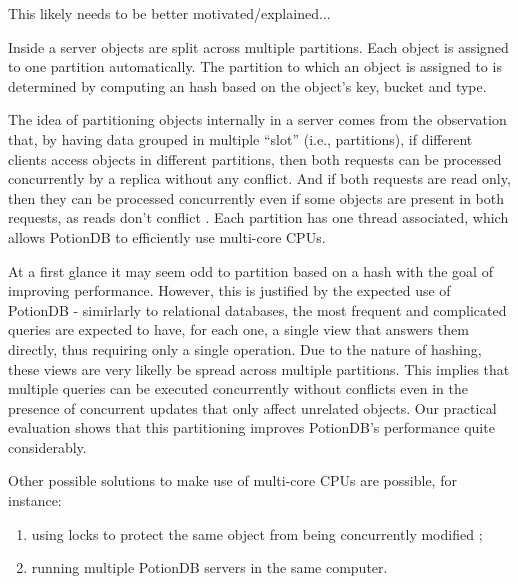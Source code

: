 \documentclass{vldb}
\newcommand{\grumbler}[2]{{\color{red}{\bf #1:} #2}}
\newcommand{\andre}[1]{\grumbler{andre}{#1}}
\begin{document}
\andre{This likely needs to be better motivated/explained...}

Inside a server objects are split across multiple partitions.
Each object is assigned to one partition automatically.
The partition to which an object is assigned to is determined by computing an hash based on the object's key, bucket and type.

The idea of partitioning objects internally in a server comes from the observation that, by having data grouped in multiple ``slot'' (i.e., partitions), if different clients access objects in different partitions, then both requests can be processed concurrently by a replica without any conflict.
And if both requests are read only, then they can be processed concurrently even if some objects are present in both requests, as reads don't conflict \cite{???}.
Each partition has one thread associated, which allows PotionDB to efficiently use multi-core CPUs.

At a first glance it may seem odd to partition based on a hash with the goal of improving performance.
However, this is justified by the expected use of PotionDB - simirlarly to relational databases, the most frequent and complicated queries are expected to have, for each one, a single view that answers them directly, thus requiring only a single operation.
Due to the nature of hashing, these views are very likelly be spread across multiple partitions.
This implies that multiple queries can be executed concurrently without conflicts even in the presence of concurrent updates that only affect unrelated objects.
Our practical evaluation shows that this partitioning improves PotionDB's performance quite considerably. %

Other possible solutions to make use of multi-core CPUs are possible, for instance:
\begin{enumerate}
	\item \label{item:locks} using locks to protect the same object from being concurrently modified \cite{???};
	\item \label{item:multiplePotion} running multiple PotionDB servers in the same computer.
\end{enumerate}
\end{document}
